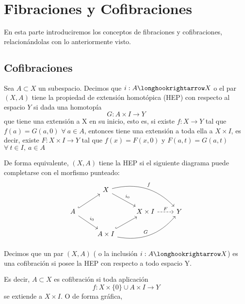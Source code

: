 \chapter{Fibraciones y Cofibraciones}
En esta parte introduciremos los conceptos de fibraciones y cofibraciones, relacionándolas con lo anteriormente visto.
\section{Cofibraciones}
\begin{defin}
Sea $A \subset X$ un subespacio. Decimos que $i : A \longhookrightarrow X$ o el par $(X, A)$ tiene la propiedad de extensión homotópica (HEP) con respecto al espacio $Y$ si dada una homotopía
\[ G : A \times I \longrightarrow Y \]
que tiene una extensión a X en su inicio, esto es, si existe $f: X \longrightarrow Y $ tal que $f(a) = G(a, 0)$ $\forall \ a \in A$, entonces tiene una extensión a toda ella a $X \times I$, es decir, existe $F : X \times I \longrightarrow Y$ tal que $f(x) = F(x,0)$ y $F(a,t) = G(a, t)$ $\forall \ t \in I, \ a \in A$ \par 
De forma equivalente, $(X,A)$ tiene la HEP si el siguiente diagrama puede completarse con el morfismo punteado:
\[
\begin{tikzcd}
	{} 						  & X \drar{i_0} \arrow[bend left]{drr}{f}			   &        					&   \\
	A \urar[hook] \drar{i_0}  &   												   & X \times I \rar[dashed]{F} & Y \\
	   						  & A \times I  \urar[hook] \arrow[bend right]{urr}{G} &   							&
\end{tikzcd}
\]
\end{defin}
\begin{defin}
Decimos que un par $(X,A)$ ( o la inclusión $i: A \longhookrightarrow X$) es una cofibración si posee la HEP con respecto a todo espacio Y. \par 
Es decir, $A \subset X$ es cofibración si toda aplicación  
\[ f : X \times \{0\} \cup A \times I \longrightarrow Y \]
se extiende a $X \times I$.
O de forma gráfica, 
\end{defin}

